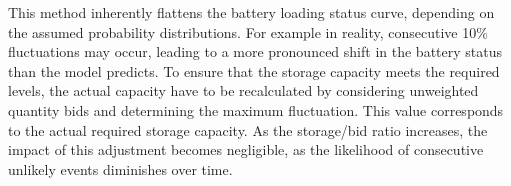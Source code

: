 This method inherently flattens the battery loading status curve, depending on the assumed probability distributions.
For example in reality, consecutive 10\% fluctuations may occur, leading to a more pronounced shift in the battery status than the model predicts.
To ensure that the storage capacity meets the required levels, the actual capacity have to be recalculated by considering unweighted quantity bids and determining the maximum fluctuation.
This value corresponds to the actual required storage capacity.
As the storage/bid ratio increases, the impact of this adjustment becomes negligible, as the likelihood of consecutive unlikely events diminishes over time.

